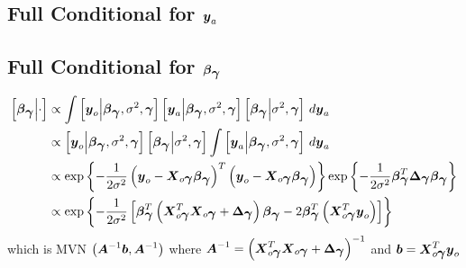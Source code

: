\documentclass[fleqn]{article}
\def\bm#1{\mbox{\boldmath $#1$}}
\begin{document}
{\subsection{Full Conditional for $\bm{y}_a$}
%
\subsection{Full Conditional for $\bm{\beta}_{\bm{\gamma}}$}
%
\begin{align*}
%
\left[ \bm{\beta}_{\bm{\gamma}} \middle| \cdot \right] & \propto \int \left[ \bm{y}_o \middle| \bm{\beta}_{\bm{\gamma}}, \sigma^2, \bm{\gamma} \right] \left[ \bm{y}_a \middle| \bm{\beta}_{\bm{\gamma}}, \sigma^2, \bm{\gamma} \right] \left[ \bm{\beta}_{\bm{\gamma}} \middle| \sigma^2, \bm{\gamma} \right] \, d \bm{y}_a \\
%
 & \propto \left[ \bm{y}_o \middle| \bm{\beta}_{\bm{\gamma}}, \sigma^2, \bm{\gamma} \right] \left[ \bm{\beta}_{\bm{\gamma}} \middle| \sigma^2, \bm{\gamma} \right] \int \left[ \bm{y}_a \middle| \bm{\beta}_{\bm{\gamma}}, \sigma^2, \bm{\gamma} \right]  \, d \bm{y}_a \\
%
 & \propto \exp{ \left\{ - \frac{1} {2 \sigma^2} \left( \bm{y}_o - \bm{X}_{o \bm{\gamma}} \bm{\beta}_{\bm{\gamma}} \right)^T \left( \bm{y}_o - \bm{X}_{o \bm{\gamma}} \bm{\beta}_{\bm{\gamma}} \right) \right\} } \exp{ \left\{ - \frac{1} {2 \sigma^2} \bm{\beta}_{\bm{\gamma}}^T \bm{\Delta}_{\bm{\gamma}} \bm{\beta}_{\bm{\gamma}} \right\} } \\
%
 & \propto \exp{ \left\{ - \frac{1} {2 \sigma^2} \left[ \bm{\beta}_{\bm{\gamma}}^T \left(\bm{X}_{o \bm{\gamma}}^T \bm{X}_{o \bm{\gamma}} + \bm{\Delta}_{\bm{\gamma}} \right) \bm{\beta}_{\bm{\gamma}} - 2 \bm{\beta}_{\bm{\gamma}}^T \left( \bm{X}_{o \bm{\gamma}}^T \bm{y}_o \right) \right] \right\} } \\
%
\end{align*}
%
which is MVN $\left( \bm{A}^{ - 1} \bm{b}, \bm{A}^{ - 1} \right)$ where $\bm{A}^{ - 1} = \left( \bm{X}_{o \bm{\gamma}}^T \bm{X}_{o \bm{\gamma}} + \bm{\Delta}_{\bm{\gamma}} \right)^{ - 1}$ and $\bm{b} = \bm{X}_{o \bm{\gamma}}^T \bm{y}_o$
%
}
\end{document}
